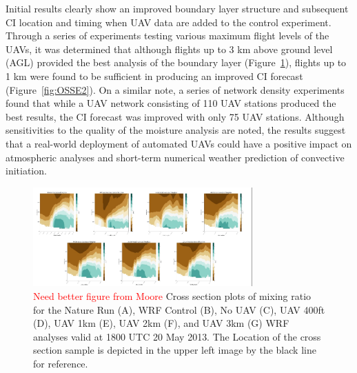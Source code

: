 \documentclass[sensors,review,submit,moreauthors,pdftex,10pt,a4paper]{mdpi}
\theoremstyle{mdpi}
\newcounter{ex}
\newcounter{re}
\theoremstyle{mdpidefinition}
\begin{document}
Initial results clearly show an improved boundary layer structure and subsequent CI location and timing when UAV data are added to the control experiment. Through a series of experiments testing various maximum flight levels of the UAVs, it was determined that although flights up to 3 km above ground level (AGL) provided the best analysis of the boundary layer (Figure~\ref{fig:OSSE1}), flights up to 1 km were found to be sufficient in producing an improved CI forecast (Figure~\ref{fig:OSSE2}). On a similar note, a series of network density experiments found that while a UAV network consisting of 110 UAV stations produced the best results, the CI forecast was improved with only 75 UAV stations. Although sensitivities to the quality of the moisture analysis are noted, the results suggest that a real-world deployment of automated UAVs could have a positive impact on atmospheric analyses and short-term numerical weather prediction of convective initiation.

\begin{figure}
\centering
\includegraphics[angle=0, width=0.75\textwidth]{figures/OSSE1.pdf}
\caption{\label{fig:OSSE1} \textcolor{red}{Need better figure from Moore} Cross section plots of mixing ratio for the Nature Run (A), WRF Control (B), No UAV (C), UAV 400ft (D), UAV 1km (E), UAV 2km (F), and UAV 3km (G) WRF analyses valid at 1800 UTC 20 May 2013. The Location of the cross section sample is depicted in the upper left image by the black line for reference.}
\end{figure}
\end{document}
